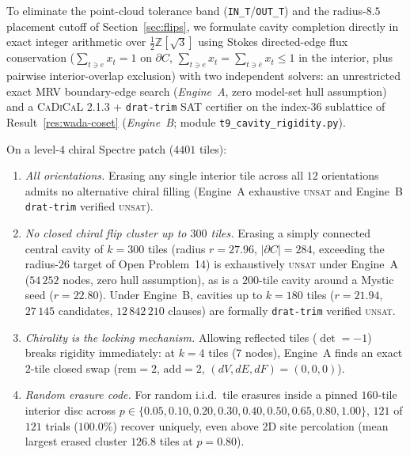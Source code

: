 To eliminate the point-cloud tolerance band (\texttt{IN\_T}/\texttt{OUT\_T}) and the radius-$8.5$ placement cutoff of Section~\ref{sec:flips}, we formulate cavity completion directly in exact integer arithmetic over $\tfrac12\mathbb{Z}[\sqrt3]$ using Stokes directed-edge flux conservation ($\sum_{t\ni e}x_t=1$ on $\partial C$, $\sum_{t\ni e}x_t=\sum_{t\ni\bar e}x_t\le1$ in the interior, plus pairwise interior-overlap exclusion) with two independent solvers: an unrestricted exact MRV boundary-edge search (\emph{Engine~A}, zero model-set hull assumption) and a \textsc{CaDiCaL} 2.1.3 + \texttt{drat-trim} SAT certifier on the index-$36$ sublattice of Result~\ref{res:wada-coset} (\emph{Engine~B}; module \texttt{t9\_cavity\_rigidity.py}).

\begin{result}\label{res:sat-rigidity}
On a level-$4$ chiral Spectre patch ($4401$ tiles):
\begin{enumerate}[leftmargin=1.4em,itemsep=1pt]
\item \emph{All orientations.} Erasing any single interior tile across all $12$ orientations admits no alternative chiral filling (Engine~A exhaustive \textsc{unsat} and Engine~B \texttt{drat-trim} verified \textsc{unsat}).
\item \emph{No closed chiral flip cluster up to $300$ tiles.} Erasing a simply connected central cavity of $k=300$ tiles (radius $r=27.96$, $|\partial C|=284$, exceeding the radius-$26$ target of Open Problem~14) is exhaustively \textsc{unsat} under Engine~A ($54\,252$ nodes, zero hull assumption), as is a $200$-tile cavity around a Mystic seed ($r=22.80$). Under Engine~B, cavities up to $k=180$ tiles ($r=21.94$, $27\,145$ candidates, $12\,842\,210$ clauses) are formally \texttt{drat-trim} verified \textsc{unsat}.
\item \emph{Chirality is the locking mechanism.} Allowing reflected tiles ($\det=-1$) breaks rigidity immediately: at $k=4$ tiles ($7$ nodes), Engine~A finds an exact $2$-tile closed swap ($\mathrm{rem}=2$, $\mathrm{add}=2$, $(dV,dE,dF)=(0,0,0)$).
\item \emph{Random erasure code.} For random i.i.d.\ tile erasures inside a pinned $160$-tile interior disc across $p\in\{0.05,0.10,0.20,0.30,0.40,0.50,0.65,0.80,1.00\}$, $121$ of $121$ trials ($100.0\%$) recover uniquely, even above 2D site percolation (mean largest erased cluster $126.8$ tiles at $p=0.80$).
\end{enumerate}
\end{result}


